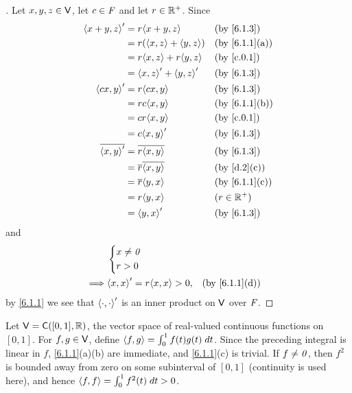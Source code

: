 \begin{proof}[]
  Let \(x, y, z \in \mathsf{V}\), let \(c \in \mathit{F}\) and let \(r \in \mathbb{R}^+\).
  Since
  \begin{align*}
    \inn{x + y, z}'    & = r\inn{x + y, z}             &  & \by{6.1.3}    \\
                       & = r (\inn{x, z} + \inn{y, z}) &  & \by{6.1.1}[a] \\
                       & = r \inn{x, z} + r \inn{y, z} &  & \by{c.0.1}    \\
                       & = \inn{x, z}' + \inn{y, z}'   &  & \by{6.1.3}    \\
    \inn{cx, y}'       & = r \inn{cx, y}               &  & \by{6.1.3}    \\
                       & = rc \inn{x, y}               &  & \by{6.1.1}[b] \\
                       & = cr \inn{x, y}               &  & \by{c.0.1}    \\
                       & = c \inn{x, y}'               &  & \by{6.1.3}    \\
    \conj{\inn{x, y}'} & = \conj{r \inn{x, y}}         &  & \by{6.1.3}    \\
                       & = \conj{r} \conj{\inn{x, y}}  &  & \by{d.2}[c]   \\
                       & = \conj{r} \inn{y, x}         &  & \by{6.1.1}[c] \\
                       & = r \inn{y, x}                &  & (r \in \R^+)  \\
                       & = \inn{y, x}'                 &  & \by{6.1.3}
  \end{align*}
  and
  \begin{align*}
             & \begin{dcases}
                 x \neq \zv \\
                 r > 0
               \end{dcases}                                      \\
    \implies & \inn{x, x}' = r \inn{x, x} > 0, &  & \by{6.1.1}[d]
  \end{align*}
  by \cref{6.1.1} we see that \(\left\langle\cdot, \cdot\right\rangle'\) is an inner product on \(\mathsf{V}\) over \(\mathit{F}\).
\end{proof}

\begin{eg}\label{6.1.4}
  Let \(\V = \cfs([0, 1], \R)\), the vector space of real-valued continuous functions on \([0, 1]\).
  For \(f, g \in \mathsf{V}\), define \(\left\langle f, g\right\rangle = \int_0^1 f(t) g(t) \; dt\).
  Since the preceding integral is linear in \(f\), \cref{6.1.1}(a)(b) are immediate, and \cref{6.1.1}(c) is trivial.
  If \(f \neq \mathit{0}\), then \(f^2\) is bounded away from zero on some subinterval of \([0, 1]\) (continuity is used here), and hence \(\left\langle f, f\right\rangle = \int_0^1 f^2(t) \; dt > 0\).
\end{eg}

